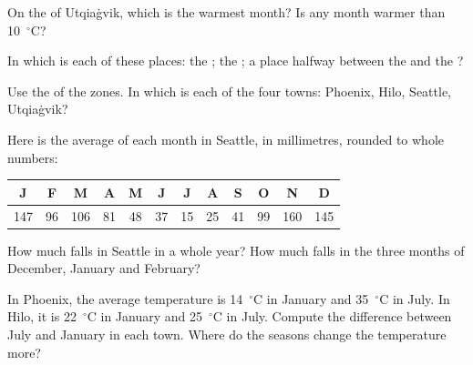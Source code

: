 \begin{exercise}[$\star$]\label{exo:g5:weather-and-climate:4}
On the  of Utqiaġvik, which is the warmest month? Is any
month warmer than 10~$^\circ$C?
\end{exercise}

\begin{exercise}[$\star$]\label{exo:g5:weather-and-climate:5}
In which  is each of these places: the ; the ; a place halfway between the  and the ?
\end{exercise}

\begin{exercise}[$\star$]\label{exo:g5:weather-and-climate:6}
Use the  of the zones. In which  is each of the four towns:
Phoenix, Hilo, Seattle, Utqiaġvik?
\end{exercise}

\begin{exercise}[$\star\star$]\label{exo:g5:weather-and-climate:7}
Here is the average  of each month in Seattle, in millimetres, rounded
to whole numbers:
\begin{center}
\begin{tabular}{|*{12}{c|}}
\hline
J & F & M & A & M & J & J & A & S & O & N & D\\
\hline
147 & 96 & 106 & 81 & 48 & 37 & 15 & 25 & 41 & 99 & 160 & 145\\
\hline
\end{tabular}
\end{center}
How much  falls in Seattle in a whole year? How much falls in the
three months of December, January and February?
\end{exercise}

\begin{exercise}[$\star\star$]\label{exo:g5:weather-and-climate:8}
In Phoenix, the average temperature is 14~$^\circ$C in January and
35~$^\circ$C in July. In Hilo, it is 22~$^\circ$C in January and
25~$^\circ$C in July. Compute the difference between July and January in
each town. Where do the seasons change the temperature more?
\end{exercise}

